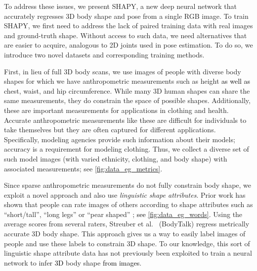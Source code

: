 \documentclass[10pt,twocolumn,letterpaper]{article}
\newcommand{\modelCOLOR}{black}
\newcommand{\modelname}{{\color{\modelCOLOR}SHAPY}\xspace}
\newcommand{\twoD}{2D\xspace}
\newcommand{\threeD}{3D\xspace}
\newcommand{\bodytalk}{\mbox{BodyTalk}\xspace}
\newcommand{\rgb}{\mbox{RGB}\xspace}
\newcommand{\cameraready}[1]{\textcolor{Fuchsia}{{#1}}\xspace}
\renewcommand{\cameraready}[1]{\textcolor{black}{{#1}}\xspace}
\newcommand{\colorTERM}{blue}
\renewcommand{\colorTERM}{black}
\newcommand{\measurements}[0]{{\color{\colorTERM}anthropometric measurements}\xspace}
\newcommand{\semanticshapeattribute}[0]{{\color{\colorTERM}semantic shape attribute}\xspace}
\newcommand{\semanticshapeattributes}[0]{{\color{\colorTERM}semantic shape attributes}\xspace}
\renewcommand{\semanticshapeattribute}[0]{{\color{\colorTERM}linguistic shape attribute}\xspace}
\renewcommand{\semanticshapeattributes}[0]{{\color{\colorTERM}linguistic shape attributes}\xspace}
\newcommand{\scores}[0]{{scores}\xspace}
\begin{document}
To address these issues, we present \modelname, a new deep neural network that accurately regresses \threeD body shape and pose from a single \rgb image. 
To train \modelname, we first need to address the lack of paired training data with real images and ground-truth shape.
Without access to such data, we need alternatives that are easier to acquire, analogous to \twoD joints used in pose estimation.
To do so, we introduce two novel datasets and corresponding 
training methods. 


First, in lieu of full \threeD body scans, we use images of people with diverse body shapes for which we have 
\measurements
such as height \cameraready{as well as} chest, waist, and hip circumference.
While many \threeD human shapes can share the same measurements, they do constrain the space of possible shapes.
Additionally, these are important measurements for applications in clothing and health.
Accurate \measurements like these are difficult for individuals to take themselves but they are often captured for different applications.
Specifically, modeling agencies provide such information about their models; accuracy is a requirement for modeling clothing.
Thus, 
we collect a diverse set of such model images (with varied ethnicity, clothing, and body shape) with associated measurements; see \cref{fig:data_eg_metrics}.

   
Since sparse \measurements do not fully constrain body shape, we exploit a novel approach and also use \emph{\semanticshapeattributes}.
Prior work has shown that people can rate images of others according to shape attributes such as ``short/tall'', ``long legs'' or ``pear shaped'' \cite{Streuber:SIGGRAPH:2016}; \cameraready{see}  \cref{fig:data_eg_words}.
Using the average \scores from several raters, Streuber et al.~\cite{Streuber:SIGGRAPH:2016} 
(\bodytalk) 
regress metrically accurate \threeD body shape.
This approach gives us a way to easily label images of people and use these labels to constrain \threeD shape.
To our knowledge, this sort of \semanticshapeattribute data has not previously been exploited to train a neural network to infer \cameraready{\threeD} body shape \cameraready{from images}.
\end{document}
